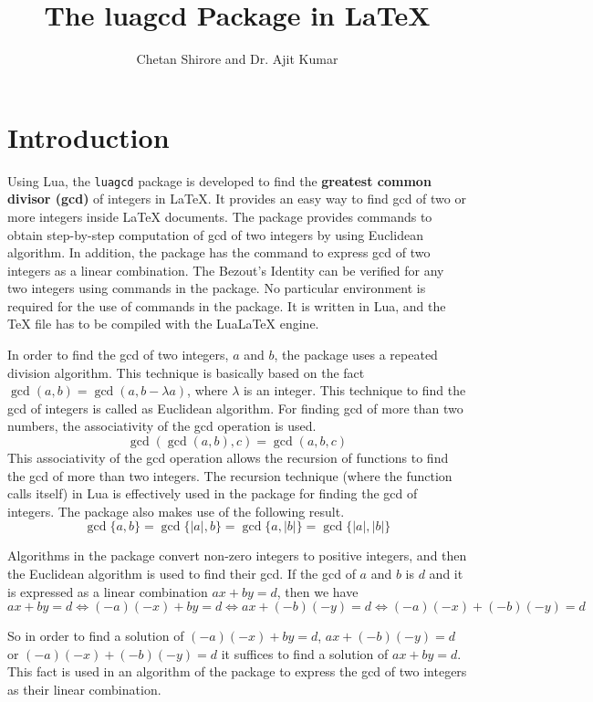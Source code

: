 \documentclass{article}
\begin{document}
\title{The luagcd Package in LaTeX}
\author{Chetan Shirore and Dr. Ajit Kumar}
\maketitle
\section{Introduction}\label{section:introduction}
Using Lua, the \verb|luagcd| package is developed to find the \textbf{greatest common divisor (gcd)} of integers in LaTeX. It provides an easy way to find gcd of two or more integers inside LaTeX documents. The package provides commands to obtain step-by-step computation of gcd of two integers by using Euclidean algorithm. In addition, the package has the command to express gcd of two integers as a linear combination. The Bezout’s Identity can be verified for any two integers using commands in the package. No particular environment is required for the use of commands in the package. It is written in Lua, and the TeX file has to be compiled with the LuaLaTeX engine.

In order to find the gcd of two integers, \(a\) and \(b\), the package uses a repeated division algorithm. This technique is basically based on the fact \(\gcd(a,b)=\gcd(a,b-\lambda a)\), where \(\lambda\) is an integer. This technique to find the gcd of integers is called as Euclidean algorithm. For finding gcd of more than two numbers, the associativity of the gcd operation is used.
\[\gcd(\gcd(a,b),c)=\gcd(a,b,c)\]
This associativity of the gcd operation allows the recursion of functions to find the gcd of more than two integers. The recursion technique (where the function calls itself) in Lua is effectively used in the package for finding the gcd of integers. The package also makes use of the following result.
 \[\gcd\{a,b\}=\gcd\{|a|,b\}=\gcd\{a,|b|\}=\gcd\{|a|,|b|\} \]
 
 Algorithms in the package convert non-zero integers to positive integers, and then the Euclidean algorithm is used to find their gcd. If the gcd of \(a\) and \(b\) is \(d\)  and it is expressed as a linear combination \(ax+by=d\), then we have
 \[ax+by=d \iff (-a)(-x)+by = d \iff ax+(-b)(-y) = d \iff (-a)(-x)+(-b)(-y) = d \]

So in order to find a solution of \((-a)(-x)+by = d\), \( ax+(-b)(-y) = d\) or \((-a)(-x)+(-b)(-y) = d\)  it suffices to find a solution of \(ax+by=d \). This fact is used in an algorithm of the package to express the gcd of two integers as their linear combination.
\end{document}
